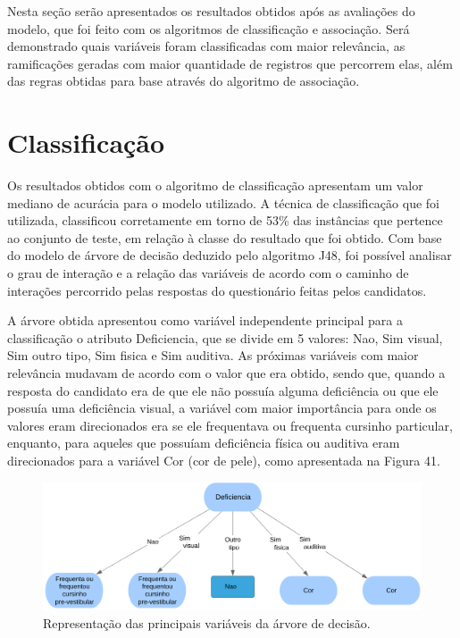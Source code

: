 \label{chapter:Resultados}

\par
Nesta seção serão apresentados os resultados obtidos após as avaliações do modelo, que foi feito com os algoritmos de classificação e associação. Será demonstrado quais variáveis foram classificadas com maior relevância, as ramificações geradas com maior quantidade de registros que percorrem elas, além das regras obtidas para base através do algoritmo de associação.

\section{Classificação}

\par
Os resultados obtidos com o algoritmo de classificação apresentam um valor mediano de acurácia para o modelo utilizado. A técnica de classificação que foi utilizada, classificou corretamente em torno de 53\% das instâncias que pertence ao conjunto de teste, em relação à classe do resultado que foi obtido. Com base do modelo de árvore de decisão deduzido pelo algoritmo J48, foi possível analisar o grau de interação e a relação das variáveis de acordo com o caminho de interações percorrido pelas respostas do questionário feitas pelos candidatos.

\par
A árvore obtida apresentou como variável independente principal para a classificação o atributo Deficiencia, que se divide em 5 valores: Nao, Sim visual, Sim outro tipo, Sim fisica e Sim auditiva. As próximas variáveis com maior relevância mudavam de acordo com o valor que era obtido, sendo que, quando a resposta do candidato era de que ele não possuía alguma deficiência ou que ele possuía uma deficiência visual, a variável com maior importância para onde os valores eram direcionados era se ele frequentava ou frequenta cursinho particular, enquanto, para aqueles que possuíam deficiência física ou auditiva eram direcionados para a variável Cor (cor de pele), como apresentada na Figura 41.

\par
\begin{figure}[!htp]
	\begin{center}
    \caption{\label{fig:waveform_fig} Representação das principais variáveis da árvore de decisão.}
	\includegraphics[scale=0.57]{Figuras/Arvore_gerada_grau2.png}
	\end{center}
\end{figure}


